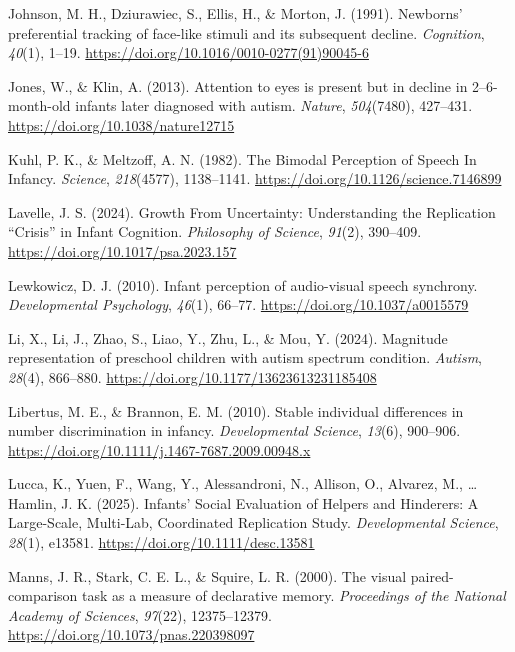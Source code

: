 \documentclass[
  english,
  man,floatsintext]{apa6}
\newlength{\cslhangindent}
\newenvironment{CSLReferences}[2] %
 {\begin{list}{}{%
  \setlength{\itemindent}{0pt}
  \setlength{\leftmargin}{0pt}
  \setlength{\parsep}{0pt}
  \ifodd #1
   \setlength{\leftmargin}{\cslhangindent}
   \setlength{\itemindent}{-1\cslhangindent}
  \fi
  \setlength{\itemsep}{#2\baselineskip}}}
 {\end{list}}
\begin{document}
\begin{CSLReferences}{1}{0}
Johnson, M. H., Dziurawiec, S., Ellis, H., \& Morton, J. (1991). Newborns' preferential tracking of face-like stimuli and its subsequent decline. \emph{Cognition}, \emph{40}(1), 1--19. \url{https://doi.org/10.1016/0010-0277(91)90045-6}

Jones, W., \& Klin, A. (2013). Attention to eyes is present but in decline in 2--6-month-old infants later diagnosed with autism. \emph{Nature}, \emph{504}(7480), 427--431. \url{https://doi.org/10.1038/nature12715}

Kuhl, P. K., \& Meltzoff, A. N. (1982). The {Bimodal Perception} of {Speech In Infancy}. \emph{Science}, \emph{218}(4577), 1138--1141. \url{https://doi.org/10.1126/science.7146899}

Lavelle, J. S. (2024). Growth {From Uncertainty}: {Understanding} the {Replication} {``{Crisis}''} in {Infant Cognition}. \emph{Philosophy of Science}, \emph{91}(2), 390--409. \url{https://doi.org/10.1017/psa.2023.157}

Lewkowicz, D. J. (2010). Infant perception of audio-visual speech synchrony. \emph{Developmental Psychology}, \emph{46}(1), 66--77. \url{https://doi.org/10.1037/a0015579}

Li, X., Li, J., Zhao, S., Liao, Y., Zhu, L., \& Mou, Y. (2024). Magnitude representation of preschool children with autism spectrum condition. \emph{Autism}, \emph{28}(4), 866--880. \url{https://doi.org/10.1177/13623613231185408}

Libertus, M. E., \& Brannon, E. M. (2010). Stable individual differences in number discrimination in infancy. \emph{Developmental Science}, \emph{13}(6), 900--906. \url{https://doi.org/10.1111/j.1467-7687.2009.00948.x}

Lucca, K., Yuen, F., Wang, Y., Alessandroni, N., Allison, O., Alvarez, M., \ldots{} Hamlin, J. K. (2025). Infants' {Social Evaluation} of {Helpers} and {Hinderers}: {A Large-Scale}, {Multi-Lab}, {Coordinated Replication Study}. \emph{Developmental Science}, \emph{28}(1), e13581. \url{https://doi.org/10.1111/desc.13581}

Manns, J. R., Stark, C. E. L., \& Squire, L. R. (2000). The visual paired-comparison task as a measure of declarative memory. \emph{Proceedings of the National Academy of Sciences}, \emph{97}(22), 12375--12379. \url{https://doi.org/10.1073/pnas.220398097}


\end{CSLReferences}
\end{document}
